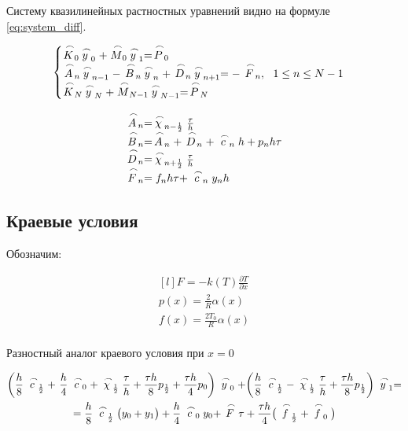 Систему квазилинейных растностных уравнений видно на формуле \ref{eq:system_diff}.

\begin{equation}\label{eq:system_diff}
    \begin{cases}
        \LittleCap{K}_0 \LittleCap{y}_0 + \LittleCap{M}_0 \LittleCap{y}_1 = \LittleCap{P}_0 \\
        \LittleCap{A}_n \LittleCap{y}_{n-1} - \LittleCap{B}_n \LittleCap{y}_n + \LittleCap{D}_n \LittleCap{y}_{n+1} = - \LittleCap{F}_n,\ \ 1 \le n \le N - 1 \\
        \LittleCap{K}_N \LittleCap{y}_N + \LittleCap{M}_{N-1} \LittleCap{y}_{N-1} = \LittleCap{P}_N \\
    \end{cases}
\end{equation}

\begin{equation*}
    \begin{matrix*}[l]
        \LittleCap{A}_n = \LittleCap{\chi}_{n-\frac{1}{2}} \frac{\tau}{h} \\
        \LittleCap{B}_n = \LittleCap{A}_n + \LittleCap{D}_n + \LittleCap{c}_n h + p_n h \tau \\
        \LittleCap{D}_n = \LittleCap{\chi}_{n + \frac{1}{2}} \frac{\tau}{h} \\
        \LittleCap{F}_n = f_n h \tau + \LittleCap{c}_n y_n h \\
    \end{matrix*}
\end{equation*}

\subsection{Краевые условия}

Обозначим:

\begin{equation*}
    \begin{matrix*}[l]
        F = - k(T) \frac{\partial T}{\partial x} \\
        p(x) = \frac{2}{R} \alpha(x) \\
        f(x) = \frac{2T_0}{R} \alpha(x) \\
    \end{matrix*}
\end{equation*}

Разностный аналог краевого условия при $x=0$

\begin{multline}\label{eq:diff_x0}
    \bigg( \frac{h}{8} \LittleCap{c}_\frac{1}{2} +\ \frac{h}{4} \LittleCap{c}_0 + \LittleCap{\chi}_\frac{1}{2} \frac{\tau}{h} + \frac{\tau h}{8} p_\frac{1}{2} + \frac{\tau h}{4} p_0 \bigg) \LittleCap{y}_0 + \bigg( \frac{h}{8} \LittleCap{c}_\frac{1}{2} - \LittleCap{\chi}_\frac{1}{2} \frac{\tau}{h} + \frac{\tau h}{8} p_\frac{1}{2} \bigg) \LittleCap{y}_1 = \\
    = \frac{h}{8} \LittleCap{c}_\frac{1}{2} \big( y_0 + y_1 \big) + \frac{h}{4} \LittleCap{c}_0 y_0 + \LittleCap{F}\tau + \frac{\tau h}{4} \big(\LittleCap{f}_\frac{1}{2} + \LittleCap{f}_0 \big)
\end{multline}

